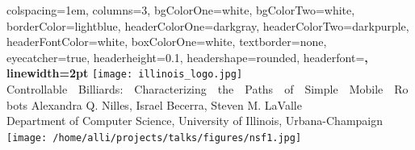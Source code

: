 \documentclass[landscape,a0paper,fontscale=0.3]{baposter} %
\begin{document}
\begin{poster}
{
colspacing=1em, %
columns=3,
bgColorOne=white, %
bgColorTwo=white, %
borderColor=lightblue, %
headerColorOne=darkgray, %
headerColorTwo=darkpurple, %
headerFontColor=white, %
boxColorOne=white, %
textborder=none, %
eyecatcher=true, %
headerheight=0.1\textheight, %
headershape=rounded, %
headerfont=\Large\bf\textsc, %
linewidth=2pt %
}
%
{\texttt{[image: illinois\_logo.jpg]}} %
{{Controllable~~Billiards:~~Characterizing~~the~~Paths~~of~~Simple~~Mobile~~Robots}\vspace{-0.0em}} %
{Alexandra Q. Nilles, Israel Becerra, Steven M. LaValle  \hspace{15pt}\\ Department of Computer Science, University of Illinois, Urbana-Champaign} %
{\texttt{[image: /home/alli/projects/talks/figures/nsf1.jpg]}} %



\end{poster}
\end{document}
